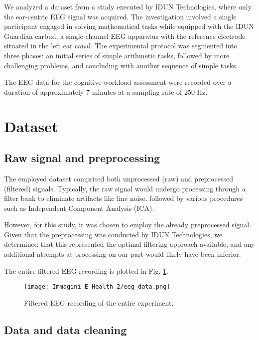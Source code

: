 \documentclass[conference]{IEEEtran}
\begin{document}
We analyzed a dataset from a study executed by IDUN Technologies, where only the ear-centric EEG signal was acquired. The investigation involved a single participant engaged in solving mathematical tasks while equipped with the IDUN Guardian earbud, a single-channel EEG apparatus with the reference electrode situated in the left ear canal. The experimental protocol was segmented into three phases: an initial series of simple arithmetic tasks, followed by more challenging problems, and concluding with another sequence of simple tasks.

The EEG data for the cognitive workload assessment were recorded over a duration of approximately 7 minutes at a sampling rate of 250 Hz.


\vspace{2mm}
\section{Dataset}
\vspace{2mm}

\subsection{Raw signal and preprocessing}

The employed dataset comprised both unprocessed (raw) and preprocessed (filtered) signals. Typically, the raw signal would undergo processing through a filter bank to eliminate artifacts like line noise, followed by various procedures such as Independent Component Analysis (ICA). 

However, for this study, it was chosen to employ the already preprocessed signal. Given that the preprocessing was conducted by IDUN Technologies, we determined that this represented the optimal filtering approach available, and any additional attempts at processing on our part would likely have been inferior.

The entire filtered EEG recording is plotted in Fig. \ref{fig:EEG_data}.

\begin{figure}[htbp]
\centerline{\texttt{[image: Immagini E Health 2/eeg\_data.png]}}
\caption{Filtered EEG recording of the entire experiment.}
\label{fig:EEG_data}
\end{figure}

\subsection{Data and data cleaning}
\label{sec:Ddc}
\end{document}
